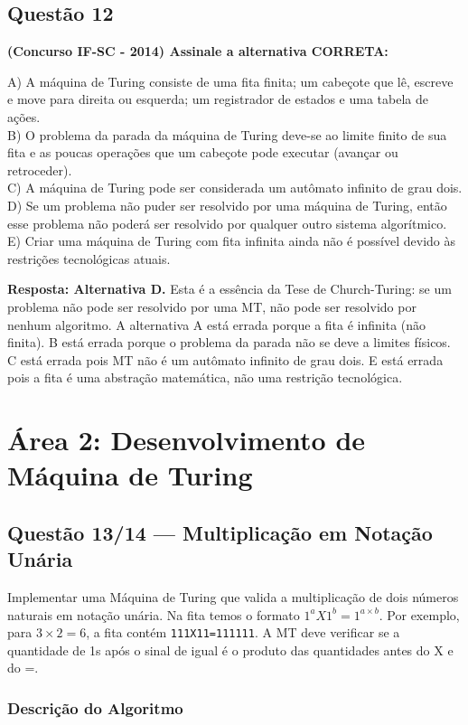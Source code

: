 \documentclass[conference]{IEEEtran}
\begin{document}
\subsection{Questão 12}
\textbf{(Concurso IF-SC - 2014) Assinale a alternativa CORRETA:}

A) A máquina de Turing consiste de uma fita finita; um cabeçote que lê, escreve e move para direita ou esquerda; um registrador de estados e uma tabela de ações. \\
B) O problema da parada da máquina de Turing deve-se ao limite finito de sua fita e as poucas operações que um cabeçote pode executar (avançar ou retroceder). \\
C) A máquina de Turing pode ser considerada um autômato infinito de grau dois. \\
D) Se um problema não puder ser resolvido por uma máquina de Turing, então esse problema não poderá ser resolvido por qualquer outro sistema algorítmico. \\
E) Criar uma máquina de Turing com fita infinita ainda não é possível devido às restrições tecnológicas atuais.

\textbf{Resposta: Alternativa D.} Esta é a essência da Tese de Church-Turing: se um problema não pode ser resolvido por uma MT, não pode ser resolvido por nenhum algoritmo. A alternativa A está errada porque a fita é infinita (não finita). B está errada porque o problema da parada não se deve a limites físicos. C está errada pois MT não é um autômato infinito de grau dois. E está errada pois a fita é uma abstração matemática, não uma restrição tecnológica.

\section{Área 2: Desenvolvimento de Máquina de Turing}

\subsection{Questão 13/14 — Multiplicação em Notação Unária}

Implementar uma Máquina de Turing que valida a multiplicação de dois números naturais em notação unária. Na fita temos o formato $1^a X 1^b = 1^{a \times b}$. Por exemplo, para $3 \times 2 = 6$, a fita contém \texttt{111X11=111111}. A MT deve verificar se a quantidade de 1s após o sinal de igual é o produto das quantidades antes do X e do =.

\subsubsection{Descrição do Algoritmo}
\end{document}
